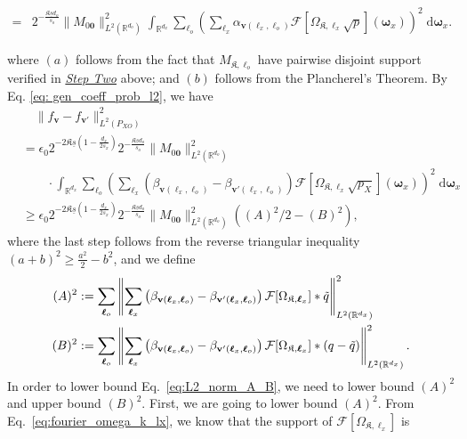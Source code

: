 \documentclass[11pt]{article}
\newcommand{\bv}{\mathbf v}
\newcommand{\bomega}{\boldsymbol{\omega}}
\newcommand{\calF}{\mathcal{F}}
\newcommand{\bl}{{\boldsymbol\ell}}
\newcommand{\0}{\mathbf{0}}
\begin{document}
\begin{appendix}
\begin{small}
\begin{align}
    =&2^{-\frac{\mathfrak{K}\underline{s}d_o}{s_o}}\|M_{0\boldsymbol{0}}\|^2_{L^2(\mathbb{R}^{d_o})}\int_{\mathbb{R}^{d_x}} \sum_{\bl_o}\left(\sum_{\bl_x}\alpha_{\bv(\bl_x,\bl_o)}\calF\left[\Omega_{\mathfrak{K},\bl_x}\sqrt{p}\right](\bomega_x)\right)^2\;\mathrm{d}\bomega_x .\label{eq: gen_coeff_prob_l2}
\end{align}
\end{small}
where $(a)$ follows from the fact that $M_{\mathfrak{K},\bl_o}$ have pairwise disjoint support verified in \underline{\emph{Step Two}} above; and $(b)$ follows from the Plancherel's Theorem. By Eq. \eqref{eq: gen_coeff_prob_l2}, we have
\begin{align}\label{eq:L2_norm_A_B}
    &\quad \|f_{\bv} - f_{\bv'}\|_{L^2(P_{XO})}^2 \nonumber \\
    &= \epsilon_0 2^{-2\mathfrak{K}\underline{s}\left(1 - \frac{d_x}{2s_x}\right)} 2^{-\frac{\mathfrak{K}\underline{s}d_o}{s_o}}\|M_{0\boldsymbol{0}}\|_{L^2(\mathbb{R}^{d_o})}^2 \nonumber \\
    &\qquad \cdot \int_{\mathbb{R}^{d_x}} \sum_{\bl_o}\left(\sum_{\bl_x}\left(\beta_{\bv(\bl_x,\bl_o)} - \beta_{\bv'(\bl_x,\bl_o)}\right)\calF\left[\Omega_{\mathfrak{K},\bl_x}\sqrt{p_X}\right](\bomega_x)\right)^2\;\mathrm{d}\bomega_x \nonumber \\
    &\geq \epsilon_0 2^{-2\mathfrak{K}\underline{s}\left(1 - \frac{d_x}{2s_x}\right)} 2^{-\frac{\mathfrak{K}\underline{s}d_o}{s_o}}\|M_{0\boldsymbol{0}}\|_{L^2(\mathbb{R}^{d_o})}^2\left((A)^2/2 - (B)^2\right),
\end{align}
where the last step follows from the reverse triangular inequality $(a+b)^2 \geq \frac{a^2}{2} - b^2$, and we define
\begin{align*}
    (A)^2&:= \sum_{\bl_o}\left\|\sum_{\bl_x}\left(\beta_{\bv(\bl_x,\bl_o)} - \beta_{\bv'(\bl_x,\bl_o)}\right) \calF[\Omega_{\mathfrak{K},\bl_x}]  \ast \Tilde{q}\right\|_{L^2(\mathbb{R}^{d_x})}^2\\
    (B)^2&:=\sum_{\bl_o}\left\|\sum_{\bl_x}\left(\beta_{\bv(\bl_x,\bl_o)} - \beta_{\bv'(\bl_x,\bl_o)}\right)  \calF[\Omega_{\mathfrak{K},\bl_x}]   \ast (q-\Tilde{q})\right\|_{L^2(\mathbb{R}^{d_x})}^2.
\end{align*}
In order to lower bound Eq.~\eqref{eq:L2_norm_A_B}, we need to lower bound $(A)^2$ and upper bound $(B)^2$.
First, we are going to lower bound $(A)^2$.
From Eq.~\eqref{eq:fourier_omega_k_lx}, we know that the support of $\calF[\Omega_{\mathfrak{K},\bl_x}]$ is 
\begin{align}\label{eq:tilde_I}

\end{align}
\end{appendix}
\end{document}
